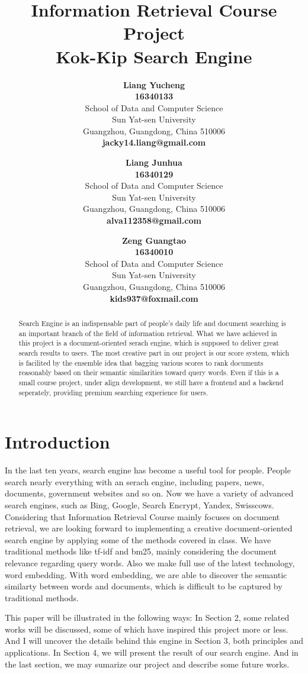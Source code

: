 \documentclass{article}
\title{Information Retrieval Course Project \\
Kok-Kip Search Engine}
\author{
  \textbf{Liang Yucheng} \\
  \textbf{16340133} \\
  School of Data and Computer Science\\
  Sun Yat-sen University\\
  Guangzhou, Guangdong, China 510006 \\
  \textbf{jacky14.liang@gmail.com} \\
  \and
  \textbf{Liang Junhua} \\
  \textbf{16340129} \\
  School of Data and Computer Science\\
  Sun Yat-sen University\\
  Guangzhou, Guangdong, China 510006 \\
  \textbf{alva112358@gmail.com} \\
  \and
  \textbf{Zeng Guangtao} \\
  \textbf{16340010} \\
  School of Data and Computer Science\\
  Sun Yat-sen University\\
  Guangzhou, Guangdong, China 510006 \\
  \textbf{kids937@foxmail.com} \\
}
\begin{document}
\maketitle

\begin{abstract}
Search Engine is an indispensable part of people's daily life and document searching is an important branch of the field of information retrieval. What we have achieved in this project is a document-oriented serach engine, which is supposed to deliver great search results to users. The most creative part in our project is our score system, which is facilited by the ensemble idea that bagging various scores to rank documents reasonably based on their semantic similarities toward query words. Even if this is a small course project, under align development, we still have a frontend and a backend seperately, providing premium searching experience for users.
\end{abstract}




\section{Introduction}
In the last ten years, search engine has become a useful tool for people. People search nearly everything with an serach engine, including papers, news, documents, government websites and so on. Now we have a variety of advanced search engines, such as Bing, Google, Search Encrypt, Yandex, Swisscows. Considering that Information Retrieval Course mainly focuses on document retrieval, we are looking forward to implementing a creative document-oriented search engine by applying some of the methods covered in class. We have traditional methods like tf-idf and bm25, mainly considering the document relevance regarding query words. Also we make full use of the latest technology, word embedding. With word embedding, we are able to discover the semantic similarty between words and documents, which is difficult to be captured by traditional methods.

This paper will be illustrated in the following ways: In Section 2, some related works will be discussed, some of which have inspired this project more or less. And I will uncover the details behind this engine in Section 3, both principles and applications. In Section 4, we will present the result of our search engine. And in the last section, we may sumarize our project and describe some future works.
\end{document}
